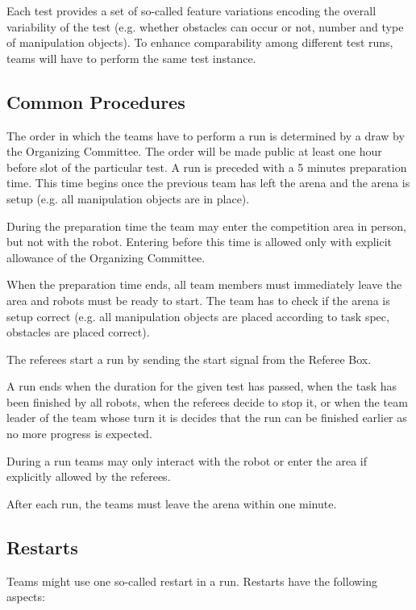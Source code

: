 Each test provides a set of so-called feature variations encoding the overall variability of the test (e.g. whether obstacles can occur or not, number and type of manipulation objects). To enhance comparability among different test runs, teams will have to perform the same test instance.


\subsection{Common Procedures}
The order in which the teams have to perform a run is determined by a draw by the Organizing Committee. The order will be made public at least one hour before slot of the particular test. A run is preceded with a 5 minutes preparation time. This time begins once the previous team has left the arena and the arena is setup (e.g. all manipulation objects are in place).
\par
During the preparation time the team may enter the competition area in person, but not with the robot. Entering before this time is allowed only with explicit allowance of the Organizing Committee.
\par
When the preparation time ends, all team members must immediately leave the area and
robots must be ready to start. The team has to check if the arena is setup correct (e.g. all manipulation objects are placed according to task spec, obstacles are placed correct).
\par
The referees start a run by sending the start signal from the Referee Box.
\par
A run ends when the duration for the given test has passed, when the task has been finished by all robots, when the referees decide to stop it, or when the team leader of the team whose turn it is decides that the run can be finished earlier as no more progress is expected.
\par
During a run teams may only interact with the robot or enter the area if explicitly allowed by the referees.
\par
After each run, the teams must leave the arena within one minute.

\subsection{Restarts}
Teams might use one so-called restart in a run. Restarts have the following aspects:


